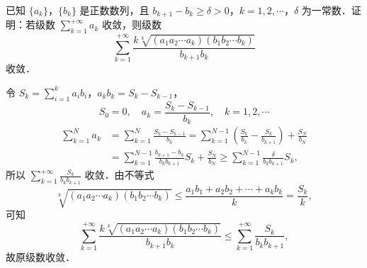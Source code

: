 已知 $\{a_{k}\}$，$\{b_{k}\}$ 是正数数列，且 $b_{k+1}-b_{k}\ge\delta>0$，$k=1,2,\cdots$，$\delta$ 为一常数．证明：若级数 $\displaystyle\sum_{k=1}^{+\infty}a_{k}$ 收敛，则级数
\[
\sum_{k=1}^{+\infty}\frac{k\sqrt[k]{\left(a_{1}a_{2}\cdots a_{k}\right)\left(b_{1}b_{2}\cdots b_{k}\right)}}{b_{k+1}b_{k}}
\]
收敛．
\begin{solution}
令 $S_{k}=\sum\limits_{i=1}^{k}a_{i}b_{i}$，$a_{k}b_{k}=S_{k}-S_{k-1}$，
\[
S_{0}=0,\quad a_{k}=\frac{S_{k}-S_{k-1}}{b_{k}},\quad k=1,2,\cdots
\]
\begin{align*}
\sum_{k=1}^{N}a_{k}
&=\sum_{k=1}^{N}\frac{S_{k}-S_{k-1}}{b_{k}}
=\sum_{k=1}^{N-1}\left(\frac{S_{k}}{b_{k}}-\frac{S_{k}}{b_{k+1}}\right)+\frac{S_{N}}{b_{N}}\\
&=\sum_{k=1}^{N-1}\frac{b_{k+1}-b_{k}}{b_{k}b_{k+1}}S_{k}+\frac{S_{N}}{b_{N}}
\ge\sum_{k=1}^{N-1}\frac{\delta}{b_{k}b_{k+1}}S_{k},
\end{align*}
所以 $\displaystyle\sum_{k=1}^{+\infty}\frac{S_{k}}{b_{k}b_{k+1}}$ 收敛．由不等式
\[
\sqrt[k]{\left(a_{1}a_{2}\cdots a_{k}\right)\left(b_{1}b_{2}\cdots b_{k}\right)}
\le\frac{a_{1}b_{1}+a_{2}b_{2}+\cdots+a_{k}b_{k}}{k}=\frac{S_{k}}{k},
\]
可知
\[
\sum_{k=1}^{+\infty}\frac{k\sqrt[k]{\left(a_{1}a_{2}\cdots a_{k}\right)\left(b_{1}b_{2}\cdots b_{k}\right)}}{b_{k+1}b_{k}}
\le\sum_{k=1}^{+\infty}\frac{S_{k}}{b_{k}b_{k+1}},
\]
故原级数收敛．
\end{solution}
